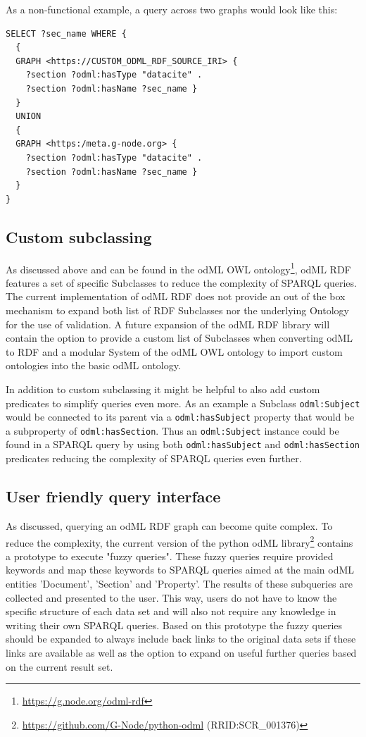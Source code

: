 \documentclass{article}
\begin{document}
As a non-functional example, a query across two graphs would look like this:

\begin{lstlisting}[label=lst:multi_graph, caption=Abstract multiple graph query, basicstyle=\small]
SELECT ?sec_name WHERE {
  {
  GRAPH <https://CUSTOM_ODML_RDF_SOURCE_IRI> {
    ?section ?odml:hasType "datacite" .
    ?section ?odml:hasName ?sec_name }
  }
  UNION
  {
  GRAPH <https:/meta.g-node.org> {
    ?section ?odml:hasType "datacite" .
    ?section ?odml:hasName ?sec_name }
  }
}
\end{lstlisting}

\subsection{Custom subclassing}\label{sec:outlook_subclassing}
As discussed above and can be found in the odML OWL ontology\footnote{\url{https://g.node.org/odml-rdf}}, odML RDF features a set of specific Subclasses to reduce the complexity of SPARQL queries. The current implementation of odML RDF does not provide an out of the box mechanism to expand both list of RDF Subclasses nor the underlying Ontology for the use of validation. A future expansion of the odML RDF library will contain the option to provide a custom list of Subclasses when converting odML to RDF and a modular System of the odML OWL ontology to import custom ontologies into the basic odML ontology.

In addition to custom subclassing it might be helpful to also add custom predicates to simplify queries even more. As an example a Subclass \texttt{odml:Subject} would be connected to its parent via a \texttt{odml:hasSubject} property that would be a subproperty of \texttt{odml:hasSection}. Thus an \texttt{odml:Subject} instance could be found in a SPARQL query by using both \texttt{odml:hasSubject} and \texttt{odml:hasSection} predicates reducing the complexity of SPARQL queries even further.

\subsection{User friendly query interface}\label{sec:outlook_fuzzy_queries}
As discussed, querying an odML RDF graph can become quite complex. To reduce the complexity, the current version of the python odML library\footnote{\url{https://github.com/G-Node/python-odml} (RRID:SCR\_001376)} contains a prototype to execute "fuzzy queries". These fuzzy queries require provided keywords and map these keywords to SPARQL queries aimed at the main odML entities 'Document', 'Section' and 'Property'. The results of these subqueries are collected and presented to the user. This way, users do not have to know the specific structure of each data set and will also not require any knowledge in writing their own SPARQL queries. Based on this prototype the fuzzy queries should be expanded to always include back links to the original data sets if these links are available as well as the option to expand on useful further queries based on the current result set.
\end{document}
